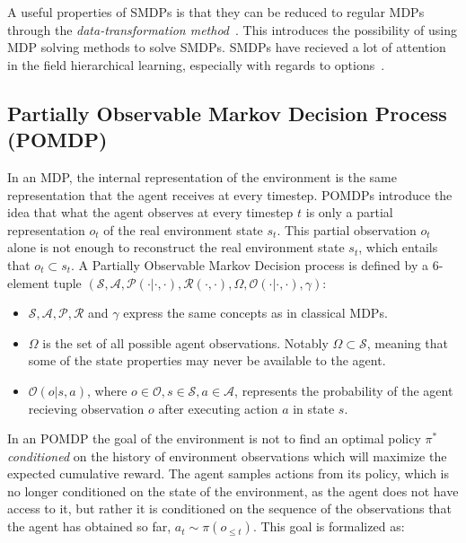 \documentclass{../main.tex}{}
\begin{document}
A useful properties of SMDPs is that they can be reduced to regular MDPs through the \textit{data-transformation method}~\citep{Piunovskiy2012}. This introduces the possibility of using MDP solving methods to solve SMDPs. SMDPs have recieved a lot of attention in the field hierarchical learning, especially with regards to options~\citep{Sutton1998}.

\subsection{Partially Observable Markov Decision Process (POMDP)}
In an MDP, the internal representation of the environment is the same representation that the agent receives at every timestep. POMDPs introduce the idea that what the agent observes at every timestep $t$ is only a partial representation $o_t$ of the real environment state $s_t$. This partial observation $o_t$ alone is not enough to reconstruct the real environment state $s_t$, which entails that $o_t \subset s_t$. A Partially Observable Markov Decision process is defined by a 6-element tuple $(\mathcal{S}, \mathcal{A}, \mathcal{P}(\cdot | \cdot, \cdot), \mathcal{R}(\cdot, \cdot), \Omega, \mathcal{O}(\cdot | \cdot, \cdot), \gamma)$:

\begin{itemize}
    \item $\mathcal{S}, \mathcal{A}, \mathcal{P}, \mathcal{R}$ and $\gamma$ express the same concepts as in classical MDPs.
    \item $\Omega$ is the set of all possible agent observations. Notably $\Omega \subset \mathcal{S}$, meaning that some of the state properties may never be available to the agent.
    \item $\mathcal{O}(o | s, a)$, where $o \in \mathcal{O}, s \in \mathcal{S}, a \in \mathcal{A}$, represents the probability of the agent recieving observation $o$ after executing action $a$ in state $s$. 
\end{itemize}

In an POMDP the goal of the environment is not to find an optimal policy $\pi^*$ \textit{conditioned} on the history of environment observations which will maximize the expected cumulative reward. The agent samples actions from its policy, which is no longer conditioned on the state of the environment, as the agent does not have access to it, but rather it is conditioned on the sequence of the observations that the agent has obtained so far, $a_t \sim \pi(o_{\leq t})$. This goal is formalized as:
\end{document}

